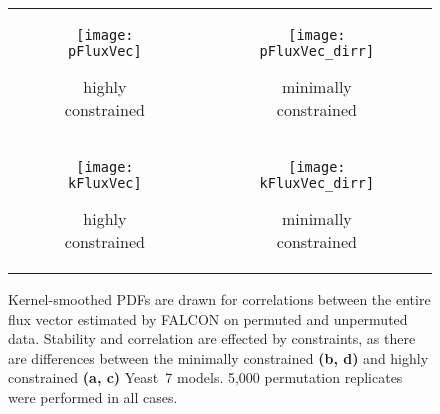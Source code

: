 \begin{figure}[!htb]
\centering
\begin{tabular}{cc}
  \begin{subfigure}[b]{0.5\textwidth}
  \texttt{[image: pFluxVec]}
  \caption{highly constrained} \label{fig:YpermCorrSup:A}
  \end{subfigure}
&
  \begin{subfigure}[b]{0.5\textwidth}
  \texttt{[image: pFluxVec\_dirr]}
  \caption{minimally constrained} \label{fig:YpermCorrSup:B}
  \end{subfigure} 
\\
  \begin{subfigure}[b]{0.5\textwidth}
  \texttt{[image: kFluxVec]}
  \caption{highly constrained} \label{fig:YpermCorrSup:C}
  \end{subfigure}
&
  \begin{subfigure}[b]{0.5\textwidth}
  \texttt{[image: kFluxVec\_dirr]}
  \caption{minimally constrained} \label{fig:YpermCorrSup:D}
  \end{subfigure} 
\\
\end{tabular}
\vspace{-4mm}
\caption{Kernel-smoothed PDFs are drawn for correlations between
the entire flux vector estimated by FALCON on permuted and unpermuted
data. Stability and correlation are effected by constraints, as there
are differences between the minimally constrained \textbf{(b, d)} and
highly constrained \textbf{(a, c)} Yeast~7 models. 5,000 permutation
replicates were performed in all cases.}
\label{fig:YpermCorrSup}
\end{figure}
\FloatBarrier

